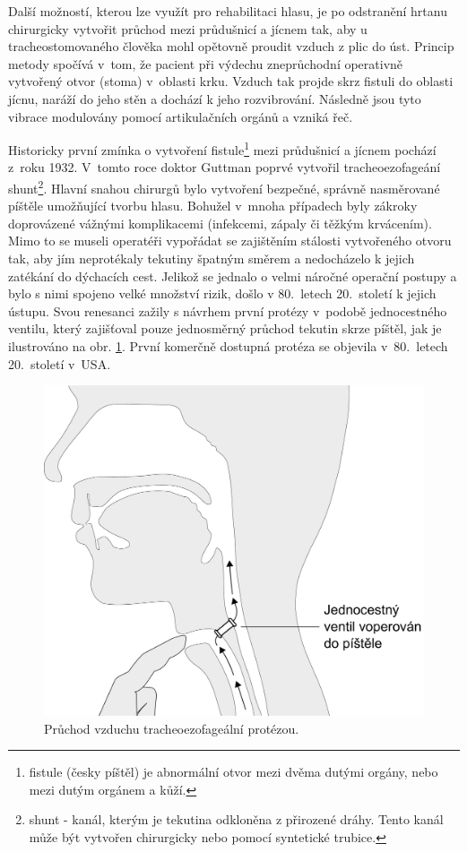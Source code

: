 Další možností, kterou lze využít pro rehabilitaci hlasu, je po odstranění hrtanu chirurgicky vytvořit průchod
mezi průdušnicí a jícnem tak, aby u tracheostomovaného člověka mohl opětovně proudit vzduch z plic do úst.
Princip metody spočívá v~tom, že pacient při výdechu zneprůchodní operativně vytvořený otvor (stoma) v~oblasti krku. Vzduch tak projde skrz fistuli do oblasti jícnu, naráží do jeho stěn a dochází k jeho rozvibrování. Následně jsou tyto vibrace modulovány pomocí artikulačních orgánů a vzniká řeč.

Historicky první zmínka o vytvoření fistule\footnote{fistule (česky píštěl) je abnormální
otvor mezi dvěma dutými orgány, nebo mezi dutým orgánem a kůží.} mezi
průdušnicí a jícnem pochází z~roku 1932. V~tomto roce doktor Guttman poprvé
vytvořil tracheoezofageání shunt\footnote{shunt - kanál, kterým je tekutina
odkloněna z přirozené dráhy. Tento kanál může být vytvořen chirurgicky nebo pomocí syntetické trubice. }.
Hlavní snahou chirurgů bylo vytvoření bezpečné, správně nasměrované píštěle
umožňující tvorbu hlasu. Bohužel v~mnoha případech byly zákroky doprovázené
vážnými komplikacemi (infekcemi, zápaly či těžkým krvácením).
Mimo to se museli operatéři vypořádat se zajištěním stálosti
vytvořeného otvoru tak, aby jím neprotékaly tekutiny špatným směrem a
nedocházelo k jejich zatékání do dýchacích cest. Jelikož se jednalo o velmi
náročné operační postupy a bylo s nimi spojeno velké množství rizik, došlo v
80.~letech 20.~století k jejich ústupu. Svou renesanci zažily s návrhem první protézy v~podobě jednocestného ventilu, který zajišťoval pouze jednosměrný
průchod tekutin skrze píštěl, jak je ilustrováno na obr.
\ref{fig:cause:treatment:shunt}. První komerčně dostupná protéza se objevila
v~80.~letech 20.~století v~USA.

\begin{figure}[htb]
  \begin{center}
    \includegraphics[width=0.6\linewidth]{ch3-cause/figures/te-shunt}
    \caption[Průchod vzduchu tracheoezofageální protézou.]{Průchod vzduchu tracheoezofageální protézou.}
    \label{fig:cause:treatment:shunt}
  \end{center}
\end{figure}


